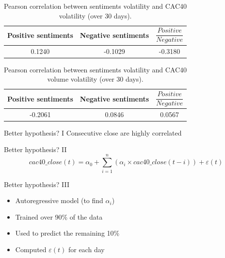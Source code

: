 \documentclass{beamer}
\begin{document}
\begin{frame}
	\begin{table}
		\begin{center}
			\begin{tabular}{|c | c | c|}
				\hline
				Positive sentiments & Negative sentiments & $\dfrac{Positive}{Negative}$\\
				\hline
				0.1240 & -0.1029 & -0.3180\\
				\hline
			\end{tabular}
		\end{center}

		\caption{Pearson correlation between sentiments volatility and CAC40 volatility (over 30 days).}
	\end{table}

	\begin{table}
		\begin{center}
			\begin{tabular}{|c | c | c|}
				\hline
				Positive sentiments & Negative sentiments & $\dfrac{Positive}{Negative}$\\
				\hline
				-0.2061 & 0.0846 & 0.0567\\
				\hline
			\end{tabular}
		\end{center}

		\caption{Pearson correlation between sentiments volatility and CAC40 volume volatility (over 30 days).}
	\end{table}
\end{frame}

\begin{frame}{Better hypothesis? I}
	Consecutive close are highly correlated
\end{frame}

\begin{frame}{Better hypothesis? II}
	$$cac40\_close(t) = \alpha_0 + \sum_{i = 1}^{n}\left(\alpha_i\times{}cac40\_close(t - i)\right) + \varepsilon(t)$$
\end{frame}

\begin{frame}{Better hypothesis? III}
	\begin{itemize}
		\item Autoregressive model (to find $\alpha_i$)
		\item Trained over 90\% of the data
		\item Used to predict the remaining 10\%
		\item Computed $\varepsilon(t)$ for each day
	\end{itemize}
\end{frame}
\end{document}
